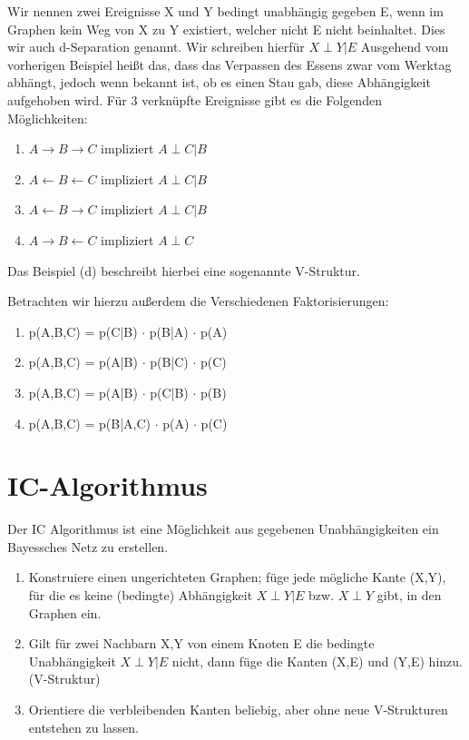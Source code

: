 Wir nennen zwei Ereignisse X und Y bedingt unabhängig gegeben E, wenn im Graphen kein Weg von X zu Y existiert, welcher nicht E nicht beinhaltet.
Dies wir auch d-Separation genannt.
Wir schreiben hierfür
$X \perp Y | E$
Ausgehend vom vorherigen Beispiel heißt das, dass das Verpassen des Essens zwar vom Werktag abhängt, jedoch wenn bekannt ist, ob es einen Stau gab, diese Abhängigkeit aufgehoben wird.
Für 3 verknüpfte Ereignisse gibt es die Folgenden Möglichkeiten:
\begin{enumerate}[label=(\alph*)]
\item $A \rightarrow B \rightarrow C$ impliziert $A \perp C | B$
\item $A \leftarrow B \leftarrow C$ impliziert $A \perp C | B$
\item $A \leftarrow B \rightarrow C$ impliziert $A \perp C | B$
\item $A \rightarrow B \leftarrow C$ impliziert $A \perp C$
\end{enumerate}
Das Beispiel (d) beschreibt hierbei eine sogenannte V-Struktur.

Betrachten wir hierzu außerdem die Verschiedenen Faktorisierungen:
\begin{enumerate}[label=(\alph*)]
\item p(A,B,C) = p(C|B) $\cdot$ p(B|A) $\cdot$ p(A)
\item p(A,B,C) = p(A|B) $\cdot$ p(B|C) $\cdot$ p(C)
\item p(A,B,C) = p(A|B) $\cdot$ p(C|B) $\cdot$ p(B)
\item p(A,B,C) = p(B|A,C) $\cdot$ p(A) $\cdot$ p(C)
\end{enumerate}

\section{IC-Algorithmus}
Der IC Algorithmus ist eine Möglichkeit aus gegebenen Unabhängigkeiten ein Bayessches Netz zu erstellen.
\begin{enumerate}
\item Konstruiere einen ungerichteten Graphen; füge jede mögliche Kante (X,Y), für die es keine (bedingte) Abhängigkeit $X \perp Y | E$ bzw. $X \perp Y$ gibt, in den Graphen ein.
\item Gilt für zwei Nachbarn X,Y von einem Knoten E die bedingte Unabhängigkeit $X \perp Y | E$ nicht, dann füge die Kanten (X,E) und (Y,E) hinzu. (V-Struktur)
\item Orientiere die verbleibenden Kanten beliebig, aber ohne neue V-Strukturen entstehen zu lassen.
\end{enumerate}

